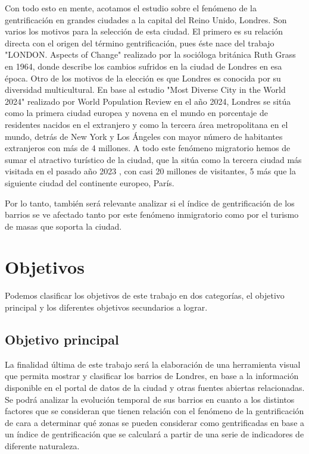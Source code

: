 \documentclass[12pt,a4paper,twoside]{book}
\begin{document}
Con todo esto en mente, acotamos el estudio sobre el fenómeno de la gentrificación en grandes ciudades a la capital del Reino Unido, Londres. Son varios los motivos para la selección de esta ciudad. El primero es su relación directa con el origen del término gentrificación, pues éste nace del trabajo "LONDON. Aspects of Change" \cite{university1964london} realizado por la socióloga británica Ruth Grass en 1964, donde describe los cambios sufridos en la ciudad de Londres en esa época. 
Otro de los motivos de la elección es que Londres es conocida por su diversidad multicultural. En base al estudio "Most Diverse City in the World 2024" \cite{noauthor_most_2024} realizado por World Population Review en el año 2024, Londres se sitúa como la primera ciudad europea y novena en el mundo en porcentaje de residentes nacidos en el extranjero y como la tercera área metropolitana en el mundo, detrás de New York y Los Ángeles con mayor número de habitantes extranjeros con más de 4 millones. A todo este fenómeno migratorio hemos de sumar el atractivo turístico de la ciudad, que la sitúa como la tercera ciudad más visitada en el pasado año 2023 \cite{garcia_most_2024}, con casi 20 millones de visitantes, 5 más que la siguiente ciudad del continente europeo, París. 

Por lo tanto, también será relevante analizar si el índice de gentrificación de los barrios se ve afectado tanto por este fenómeno inmigratorio como por el turismo de masas que soporta la ciudad.

\section{Objetivos}

Podemos clasificar los objetivos de este trabajo en dos categorías, el objetivo principal y los diferentes objetivos secundarios a lograr.

\subsection{Objetivo principal}

La finalidad última de este trabajo será la elaboración de una herramienta visual que permita mostrar y clasificar los barrios de Londres, en base a la información disponible en el portal de datos de la ciudad \cite{noauthor_london_nodate} y otras fuentes abiertas relacionadas. Se podrá analizar la evolución temporal de sus barrios en cuanto a los distintos factores que se consideran que tienen relación con el fenómeno de la gentrificación de cara a determinar qué zonas se pueden considerar como gentrificadas en base a un índice de gentrificación que se calculará a partir de una serie de indicadores de diferente naturaleza.
\end{document}
